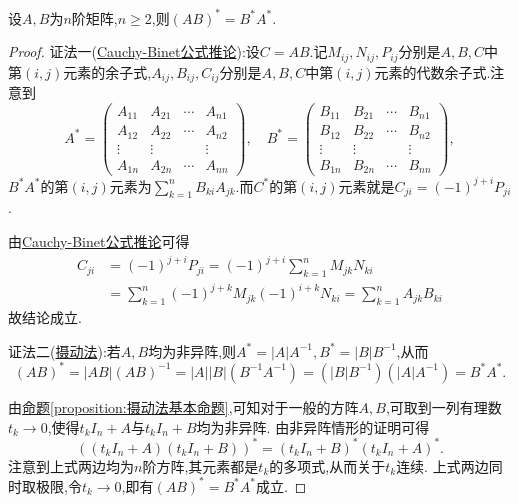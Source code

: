 \documentclass[../../main.tex]{subfiles}%
\begin{document}
\begin{theorem}[矩阵乘积的伴随]\label{theorem:矩阵乘积的伴随}
设\(A,B\)为\(n\)阶矩阵,\(n\geqslant  2\),则\((AB)^* = B^*A^*\).
\end{theorem}
\begin{proof}

{\color{blue}证法一(\hyperref[corollary:Cauchy-Binet公式推论]{Cauchy-Binet公式推论}):}设\(C = AB\).记\(M_{ij}, N_{ij}, P_{ij}\)分别是\(A, B, C\)中第\((i, j)\)元素的余子式,\(A_{ij}, B_{ij}, C_{ij}\)分别是\(A, B, C\)中第\((i, j)\)元素的代数余子式.注意到
\[
A^* = 
\begin{pmatrix}
A_{11} & A_{21} & \cdots & A_{n1} \\
A_{12} & A_{22} & \cdots & A_{n2} \\
\vdots & \vdots & & \vdots \\
A_{1n} & A_{2n} & \cdots & A_{nn}
\end{pmatrix},
\quad
B^* = 
\begin{pmatrix}
B_{11} & B_{21} & \cdots & B_{n1} \\
B_{12} & B_{22} & \cdots & B_{n2} \\
\vdots & \vdots & & \vdots \\
B_{1n} & B_{2n} & \cdots & B_{nn}
\end{pmatrix},
\]
\(B^*A^*\)的第\((i, j)\)元素为\(\sum_{k = 1}^{n} B_{ki}A_{jk}\).而\(C^*\)的第\((i, j)\)元素就是\(C_{ji} = (-1)^{j + i}P_{ji}\).

由\hyperref[corollary:Cauchy-Binet公式推论]{Cauchy-Binet公式推论}可得
\begin{align*}
C_{ji} &= (-1)^{j + i}P_{ji} = (-1)^{j + i} \sum_{k = 1}^{n} M_{jk}N_{ki}\\
&= \sum_{k = 1}^{n} (-1)^{j + k}M_{jk}(-1)^{i + k}N_{ki} = \sum_{k =1}^{n} A_{jk}B_{ki}
\end{align*}
故结论成立.

{\color{blue}证法二(\hyperref[example:摄动法]{摄动法}):}若\(A,B\)均为非异阵,则\(A^* = |A|A^{-1},B^* = |B|B^{-1}\),从而
\[
(AB)^* = |AB|(AB)^{-1} = |A||B|(B^{-1}A^{-1})=(|B|B^{-1})(|A|A^{-1}) = B^*A^*.
\]

由\hyperref[proposition:摄动法基本命题]{命题\ref{proposition:摄动法基本命题}},可知对于一般的方阵\(A,B\),可取到一列有理数\(t_k\rightarrow0\),使得\(t_kI_n + A\)与\(t_kI_n + B\)均为非异阵. 由非异阵情形的证明可得
\[
((t_kI_n + A)(t_kI_n + B))^*=(t_kI_n + B)^*(t_kI_n + A)^*.
\]
注意到上式两边均为\(n\)阶方阵,其元素都是\(t_k\)的多项式,从而关于\(t_k\)连续. 上式两边同时取极限,令\(t_k\rightarrow0\),即有\((AB)^* = B^*A^*\)成立.

\end{proof}
\end{document}
